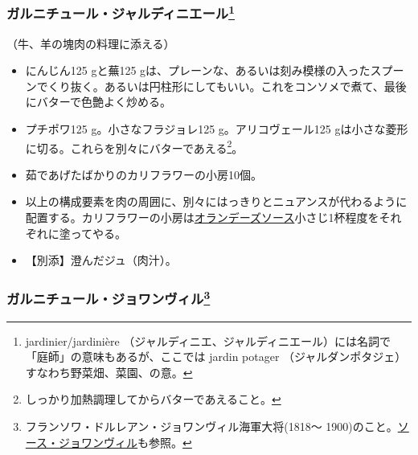 \begin{recette}
\atoaki{}

\hypertarget{garniture-jardiniere}{%
\subsubsection[ガルニチュール・ジャルディニエール]{\texorpdfstring{ガルニチュール・ジャルディニエール\footnote{jardinier/jardinière
  （ジャルディニエ、ジャルディニエール）には名詞で「庭師」の意味もあるが、ここでは
  jardin potager （ジャルダンポタジェ）すなわち野菜畑、菜園、の意。}}{ガルニチュール・ジャルディニエール}}\label{garniture-jardiniere}}



（牛、羊の塊肉の料理に添える）

\begin{itemize}
\item
  にんじん125 gと蕪125
  gは、プレーンな、あるいは刻み模様の入ったスプーンでくり抜く。あるいは円柱形にしてもいい。これをコンソメで煮て、最後にバターで色艶よく炒める。
\item
  プチポワ125 g。小さなフラジョレ125 g。アリコヴェール125
  gは小さな菱形に切る。これらを別々にバターであえる\footnote{しっかり加熱調理してからバターであえること。}。
\item
  茹であげたばかりのカリフラワーの小房10個。
\item
  以上の構成要素を肉の周囲に、別々にはっきりとニュアンスが代わるように配置する。カリフラワーの小房は\protect\hyperlink{sauce-hollandaise}{オランデーズソース}小さじ1杯程度をそれぞれに塗ってやる。
\item
  【別添】澄んだジュ（肉汁）。
\end{itemize}

\atoaki{}

\hypertarget{garniture-joinville}{%
\subsubsection[ガルニチュール・ジョワンヴィル]{\texorpdfstring{ガルニチュール・ジョワンヴィル\footnote{フランソワ・ドルレアン・ジョワンヴィル海軍大将(1818〜
  1900)のこと。\protect\hyperlink{sauce-joinville}{ソース・ジョワンヴィル}も参照。}}{ガルニチュール・ジョワンヴィル}}\label{garniture-joinville}}


\end{recette}
